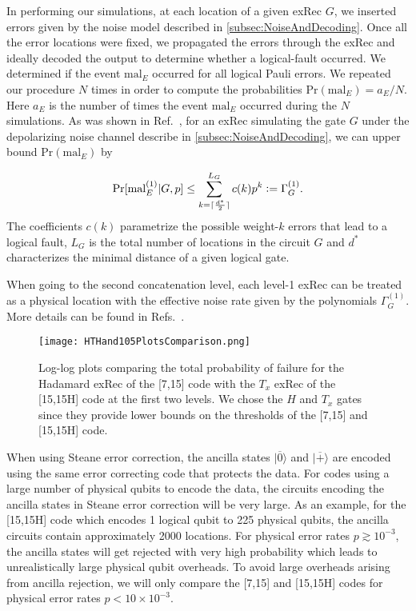 \documentclass[pra,longbibliography,twocolumn,showpacs,nofootinbib,superscriptaddress,notitlepage]{revtex4-1}
\newcommand{\ket}[1]{|#1\rangle}  %
\begin{document}
In performing our simulations, at each location of a given exRec $G$, we inserted errors given by the noise model described in \cref{subsec:NoiseAndDecoding}. Once all the error locations were fixed, we propagated the errors through the exRec and ideally decoded the output to determine whether a logical-fault occurred. We determined if the event $\mathrm{mal}_{E}$ occurred for all logical Pauli errors. We repeated our procedure $N$ times in order to compute the probabilities $\mathrm{Pr}(\mathrm{mal}_{E}) = a_{E}/N$. Here $a_{E}$ is the number of times the event $\mathrm{mal}_{E}$ occurred during the $N$ simulations. 
As was shown in Ref.~\cite{CJL16}, for an exRec simulating the gate $G$ under the depolarizing noise channel describe in \cref{subsec:NoiseAndDecoding}, we can upper bound $\mathrm{Pr}(\mathrm{mal}_{E})$ by

\begin{align}
\mathrm{Pr}[\mathrm{mal}^{(1)}_{E}|G,p] \le \sum^{L_{G}}_{k=\lceil \frac{d^{*}}{2} \rceil}c(k)p^{k} \vcentcolon = \Gamma^{(1)}_{G}.
\label{eq:UpperBoundProb}
\end{align}
The coefficients $c(k)$ parametrize the possible weight-$k$ errors that lead to a logical fault, $L_{G}$ is the total number of locations in the circuit $G$ and $d^{*}$ characterizes the minimal distance of a given logical gate. 

When going to the second concatenation level, each level-1 exRec can be treated as a physical location with the effective noise rate given by the polynomials $\Gamma^{(1)}_{G}$. More details can be found in Refs.~\cite{CJL16,CJL16b}.

\begin{figure}
\centering
\texttt{[image: HTHand105PlotsComparison.png]}
\caption{Log-log plots comparing the total probability of failure for the Hadamard exRec of the [7,15] code with the $T_{x}$ exRec of the [15,15H] code at the first two levels. We chose the $H$ and $T_{x}$ gates since they provide lower bounds on the thresholds of the [7,15] and [15,15H] code.}
\label{fig:225and105Comparison}
\end{figure}


When using Steane error correction, the ancilla states $\ket{\overline{0}}$ and $\ket{\overline{+}}$ are encoded using the same error correcting code that protects the data. For codes using a large number of physical qubits to encode the data, the circuits encoding the ancilla states in Steane error correction will be very large. As an example, for the [15,15H] code which encodes 1 logical qubit to 225 physical qubits, the ancilla circuits contain approximately 2000 locations. For physical error rates $p \gtrsim 10^{-3}$, the ancilla states will get rejected with very high probability which leads to unrealistically large physical qubit overheads. To avoid large overheads arising from ancilla rejection, we will only compare the [7,15] and [15,15H] codes for physical error rates $p < 10 \times 10^{-3}$.
\end{document}

